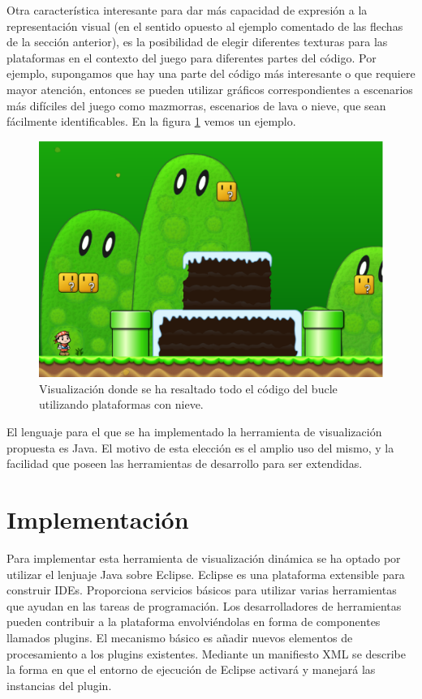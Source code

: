 \documentclass{llncs}
\begin{document}
Otra característica interesante para dar más capacidad de expresión a la representación visual (en el sentido opuesto al ejemplo comentado de las flechas de la sección anterior), es la posibilidad de elegir diferentes texturas para las plataformas en el contexto del juego para diferentes partes del código. Por ejemplo, supongamos que hay una parte del código más interesante o que requiere mayor atención, entonces se pueden utilizar gráficos correspondientes a escenarios más difíciles del juego como mazmorras, escenarios de lava o nieve, que sean fácilmente identificables. En la figura \ref{fig:texture} vemos un ejemplo.

\begin{figure}[ht]
\begin{center}
\includegraphics[scale=0.15]{images/texture.eps}
\caption{Visualización donde se ha resaltado todo el código del bucle utilizando plataformas con nieve.
\label{fig:texture}}
\end{center}
\end{figure}

El lenguaje para el que se ha implementado la herramienta de visualización propuesta es Java. El motivo de esta elección es el amplio uso del mismo, y la facilidad que poseen las herramientas de desarrollo para ser extendidas.



\section{Implementación}
\label{sec:details}
Para implementar esta herramienta de visualización dinámica se ha optado por utilizar el lenjuaje Java sobre Eclipse. Eclipse es una plataforma extensible para construir IDEs. Proporciona servicios básicos para utilizar varias herramientas que ayudan en las tareas de programación. Los desarrolladores de herramientas pueden contribuir a la plataforma envolviéndolas en forma de componentes llamados plugins. El mecanismo básico es añadir nuevos elementos de procesamiento a los plugins existentes. Mediante un manifiesto XML se describe la forma en que el entorno de ejecución de Eclipse activará y manejará las instancias del plugin. 
\end{document}
